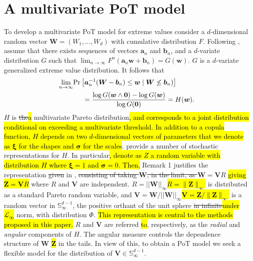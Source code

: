 \documentclass[iicol,sn-basic]{sn-jnl}
\newcommand{\prob}[1]{\text{Pr}\left[#1\right]}
\theoremstyle{thmstyleone}
\begin{document}
\section{A multivariate PoT model\label{sec:multivariatepot}}
To develop a multivariate PoT model for extreme values consider a $d$-dimensional random vector $\bm{W} = (W_1, \ldots ,W_d)$ with cumulative distribution $F$. Following \cite{RoSeWa2018a}, assume that there exists sequences of vectors $\bm{a}_n$ and $\bm{b}_n$, and a $d$-variate distribution $G$ such that $\lim_{n\rightarrow\infty} F^n(\bm{a}_n \bm{w} + \bm{b}_n) = G(\bm{w})$. $G$ is a $d$-variate generalized extreme value distribution. It follows that
\begin{equation*}
\begin{aligned}
\lim\limits_{n\rightarrow\infty} &\prob{\bm{a}^{-1}_n (\bm{W} - \bm{b}_n)
\leq \bm{w} \mid \bm{W} \not\leq \bm{b}_n)} \\
&\hspace{0.5cm}= \frac{\log G(\bm{w} \wedge \bm{0})
- \log G(\bm{w}) }{\log G(\bm{0})} = H(\bm{w}).
\end{aligned}
\end{equation*}
$H$ is \st{the}\hl{a} multivariate Pareto distribution\hl{, and corresponds to a joint distribution conditional on exceeding a multivariate threshold. In addition to a copula function, $H$ depends on two $d$-dimensional vectors of parameters that we denote as $\bm{\xi}$ for the shapes and $\bm{\sigma}$ for the scales}. \cite{RoSeWa2018a} provide a number of stochastic representations for $H$. In particular\hl{, denote as $Z$ a random variable with distribution $H$ where $\bm{\xi}= 1$ and $\bm{\sigma} = 0$.  Then,} Remark 1 justifies the representation \st{given } in \cite{ferreira2014}, \st{consisting of taking $\bm{W}$, in the limit, as $\bm{W} = \bm{V}R$} \hl{giving $\bm{Z} = \bm{V}R$} where $R$ and $\bm{V}$ are independent. \st{$R = ||\bm{W}||_\infty$}\hl{$R = \|\bm{Z}\|_\infty$} is distributed as a standard Pareto random variable, and \st{$\bm{V} = \bm{W}/||\bm{W}||_\infty$}\hl{$\bm{V} = \bm{Z}/\|\bm{Z}\|_\infty$} is a random vector in $\mathbb{S}_{\infty}^{d-1}$, the positive orthant of the unit sphere \st{in infinite}\hl{under $\mathcal{L}_{\infty}$} norm, with distribution $\Phi$.  \hl{This representation is central to the methods proposed in this paper.  }$R$ and $\bm{V}$ are referred\hl{ to}, respectively, as the {\em radial} and {\em angular} components of $H$. The angular measure controls the dependence  structure of \st{ $\bm{W}$} \hl{$\bm{Z}$}  in the tails. In view of this, to obtain a  PoT model we seek a flexible model for the distribution of $\bm{V} \in {\mathbb S}_{\infty}^{d-1}$.
\end{document}
